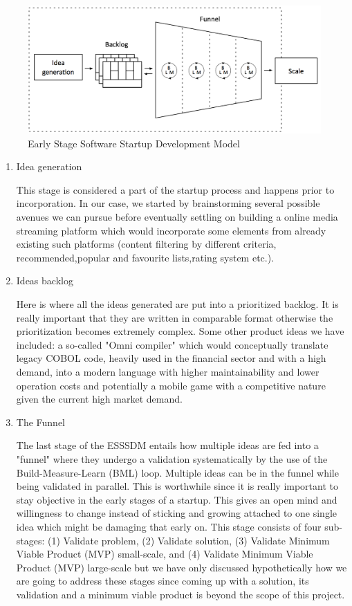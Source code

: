 \begin{figure}[h]
\begin{center}
\includegraphics[scale=0.55]{./pics/ESSSDM}
\caption{Early Stage Software Startup Development Model}
\label{fig:esssdm}
\end{center}
\end{figure}
\begin{enumerate}

\item Idea generation

This stage is considered a part of the startup process and happens prior to incorporation. In our case, we started by brainstorming several possible avenues we can pursue before eventually settling on building a online media streaming platform which would incorporate some elements from already existing such platforms (content filtering by different criteria, recommended,popular and favourite lists,rating system etc.). 
\item Ideas backlog

Here is where all the ideas generated are put into a prioritized backlog. It is really important that they are written in comparable format otherwise the prioritization  becomes extremely complex. Some other product ideas we have included: a so-called "Omni compiler" which would conceptually translate legacy COBOL code, heavily used in the financial sector and with a high demand, into a modern language with higher maintainability and lower operation costs and potentially a mobile game with a competitive nature given the current high market demand.
\item The Funnel

The last stage of the ESSSDM entails how multiple ideas are fed into a "funnel" where they undergo a validation systematically by the use of the Build-Measure-Learn (BML) loop. Multiple ideas can be in the funnel while being validated in parallel. This is worthwhile since it is really important to stay objective in the early stages of a startup. This gives an open mind and willingness to change instead of sticking and growing attached to one single idea which might be damaging that early on. This stage consists of four sub-stages: (1) Validate problem, (2) Validate solution, (3) Validate Minimum Viable Product (MVP) small-scale, and (4) Validate Minimum Viable Product (MVP) large-scale but we have only discussed hypothetically how we are going to address these stages since coming up with a solution, its validation and a minimum viable product is beyond the scope of this project.
 \end{enumerate}
 
